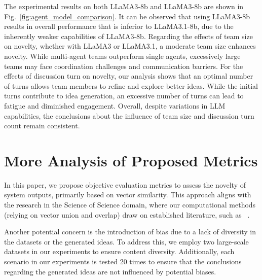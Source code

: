 \documentclass[11pt]{article}
\begin{document}
{
The experimental results on both LLaMA3-8b and LLaMA3-8b are shown in Fig.~\ref{fig:agent_model_comparison}. It can be observed that using LLaMA3-8b results in overall performance that is inferior to LLaMA3.1-8b, due to the inherently weaker capabilities of LLaMA3-8b. Regarding the effects of team size on novelty, whether with LLaMA3 or LLaMA3.1, a moderate team size enhances novelty. While multi-agent teams outperform single agents, excessively large teams may face coordination challenges and communication barriers. For the effects of discussion turn on novelty, our analysis shows that an optimal number of turns allows team members to refine and explore better ideas. While the initial turns contribute to idea generation, an excessive number of turns can lead to fatigue and diminished engagement. Overall, despite variations in LLM capabilities, the conclusions about the influence of team size and discussion turn count remain consistent.
}


\section{More Analysis of Proposed Metrics}\label{app_metric}

In this paper, we propose objective evaluation metrics to assess the novelty of system outputs, primarily based on vector similarity. This approach aligns with the research in the Science of Science domain, where our computational methods (relying on vector union and overlap) draw on established literature, such as ~\citet{boyack2005mapping, shi2023surprising, liu2023data}.

Another potential concern is the introduction of bias due to a lack of diversity in the datasets or the generated ideas. To address this, we employ two large-scale datasets in our experiments to ensure content diversity. Additionally, each scenario in our experiments is tested 20 times to ensure that the conclusions regarding the generated ideas are not influenced by potential biases.
\end{document}
